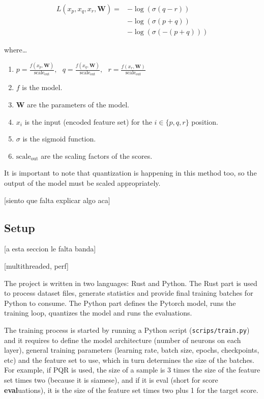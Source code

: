\begin{align*}
L(x_p, x_q, x_r, \bm{W})=
& -\log\left(\sigma(q - r)\right) \\
& -\log\left(\sigma(p + q)\right) \\
& -\log\left(\sigma(-(p + q))\right)
\end{align*}

where\dots

\begin{enumerate}
\itemsep0em
\item $
p = \frac{f(x_p, \bm{W})}{\text{scale}_{\text{out}}},\text{ }
q = \frac{f(x_q, \bm{W})}{\text{scale}_{\text{out}}},\text{ }
r = \frac{f(x_r, \bm{W})}{\text{scale}_{\text{out}}}
$
\item $f$ is the model.
\item $\bm{W}$ are the parameters of the model.
\item $x_i$ is the input (encoded feature set) for the $i \in \{p,q,r\}$ position.
\item $\sigma$ is the sigmoid function.
\item $\text{scale}_{\text{out}}$ are the scaling factors of the scores.
\end{enumerate}

It is important to note that quantization is happening in this method too, so the output of the model must be scaled appropriately.

[siento que falta explicar algo aca]

\subsection{Setup}

[a esta seccion le falta banda]


[multithreaded, perf]

The project is written in two languages: Rust and Python. The Rust part is used to process dataset files, generate statistics and provide final training batches for Python to consume. The Python part defines the Pytorch model, runs the training loop, quantizes the model and runs the evaluations.


The training process is started by running a Python script (\texttt{scrips/train.py}) and it requires to define the model architecture (number of neurons on each layer), general training parameters (learning rate, batch size, epochs, checkpoints, etc) and the feature set to use, which in turn determines the size of the batches. For example, if PQR is used, the size of a sample is 3 times the size of the feature set times two (because it is siamese), and if it is eval (short for score \textbf{eval}uations), it is the size of the feature set times two plus 1 for the target score.

